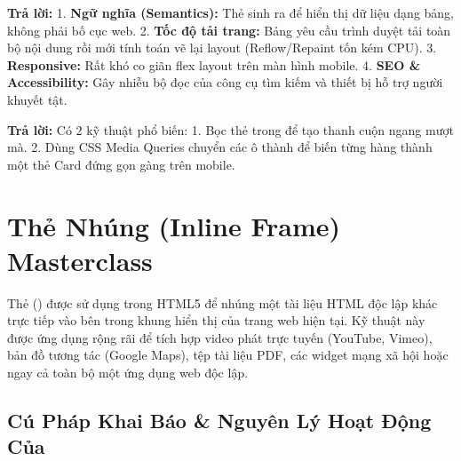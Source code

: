 \begin{conceptBox}
\textbf{Trả lời:} 
1. \textbf{Ngữ nghĩa (Semantics):} Thẻ  sinh ra để hiển thị dữ liệu dạng bảng, không phải bố cục web. 
2. \textbf{Tốc độ tải trang:} Bảng yêu cầu trình duyệt tải toàn bộ nội dung rồi mới tính toán vẽ lại layout (Reflow/Repaint tốn kém CPU). 
3. \textbf{Responsive:} Rất khó co giãn flex layout trên màn hình mobile. 
4. \textbf{SEO \& Accessibility:} Gây nhiễu bộ đọc của công cụ tìm kiếm và thiết bị hỗ trợ người khuyết tật.
\end{conceptBox}

\begin{conceptBox}
\textbf{Trả lời:} Có 2 kỹ thuật phổ biến:
1. Bọc thẻ  trong  để tạo thanh cuộn ngang mượt mà.
2. Dùng CSS Media Queries chuyển các ô  thành  để biến từng hàng  thành một thẻ Card đứng gọn gàng trên mobile.
\end{conceptBox}

\Needspace*{80pt}
\section{Thẻ Nhúng  (Inline Frame) Masterclass}
\label{sec:html_iframe_masterclass}

Thẻ  () được sử dụng trong HTML5 để nhúng một tài liệu HTML độc lập khác trực tiếp vào bên trong khung hiển thị của trang web hiện tại. Kỹ thuật này được ứng dụng rộng rãi để tích hợp video phát trực tuyến (YouTube, Vimeo), bản đồ tương tác (Google Maps), tệp tài liệu PDF, các widget mạng xã hội hoặc ngay cả toàn bộ một ứng dụng web độc lập.

\subsection{Cú Pháp Khai Báo \& Nguyên Lý Hoạt Động Của }

